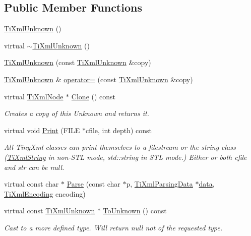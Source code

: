 \subsection*{Public Member Functions}
\begin{DoxyCompactItemize}
\item 
\hyperlink{class_ti_xml_unknown_a945f09b3c6538099c69fc563216750c3}{TiXmlUnknown} ()
\item 
virtual \hyperlink{class_ti_xml_unknown_ac21966c3b551553d760b4a339c9acda0}{$\sim$TiXmlUnknown} ()
\item 
\hyperlink{class_ti_xml_unknown_abe798ff4feea31474850c7f0de6bdf5e}{TiXmlUnknown} (const \hyperlink{class_ti_xml_unknown}{TiXmlUnknown} \&copy)
\item 
\hyperlink{class_ti_xml_unknown}{TiXmlUnknown} \& \hyperlink{class_ti_xml_unknown_a60560b5aacb4bdc8b2b5f02f0a99c5c0}{operator=} (const \hyperlink{class_ti_xml_unknown}{TiXmlUnknown} \&copy)
\item 
virtual \hyperlink{class_ti_xml_node}{TiXmlNode} $\ast$ \hyperlink{class_ti_xml_unknown_a675c4b2684af35e4c7649b7fd5ae598d}{Clone} () const 
\begin{DoxyCompactList}\small\item\em Creates a copy of this Unknown and returns it. \end{DoxyCompactList}\item 
virtual void \hyperlink{class_ti_xml_unknown_a025f19c21ef01ea9be50febb8fe0ba06}{Print} (FILE $\ast$cfile, int depth) const 
\begin{DoxyCompactList}\small\item\em All TinyXml classes can print themselves to a filestream or the string class (\hyperlink{class_ti_xml_string}{TiXmlString} in non-\/STL mode, std::string in STL mode.) Either or both cfile and str can be null. \end{DoxyCompactList}\item 
virtual const char $\ast$ \hyperlink{class_ti_xml_unknown_aa51c2694e4177b5f0b5429ee5a81b58d}{Parse} (const char $\ast$p, \hyperlink{class_ti_xml_parsing_data}{TiXmlParsingData} $\ast$\hyperlink{bootstrap_8cc_a923b2158227405b9f7a6eceb6c7104c8}{data}, \hyperlink{tinyxml_8h_a88d51847a13ee0f4b4d320d03d2c4d96}{TiXmlEncoding} encoding)
\item 
virtual const \hyperlink{class_ti_xml_unknown}{TiXmlUnknown} $\ast$ \hyperlink{class_ti_xml_unknown_ab0313e5fe77987d746ac1a97a254419d}{ToUnknown} () const 
\begin{DoxyCompactList}\small\item\em Cast to a more defined type. Will return null not of the requested type. \end{DoxyCompactList}\item 

\end{DoxyCompactItemize}
